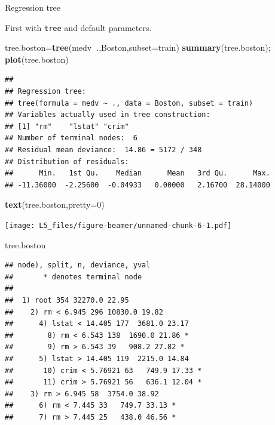 \documentclass[
  ignorenonframetext,
]{beamer}
\newenvironment{Shaded}{\begin{snugshade}}{\end{snugshade}}
\newcommand{\DataTypeTok}[1]{\textcolor[rgb]{0.13,0.29,0.53}{#1}}
\newcommand{\DecValTok}[1]{\textcolor[rgb]{0.00,0.00,0.81}{#1}}
\newcommand{\KeywordTok}[1]{\textcolor[rgb]{0.13,0.29,0.53}{\textbf{#1}}}
\newcommand{\NormalTok}[1]{#1}
\newcommand{\OperatorTok}[1]{\textcolor[rgb]{0.81,0.36,0.00}{\textbf{#1}}}
\begin{document}
\begin{frame}[fragile]

\begin{block}{Regression tree}

First with \texttt{tree} and default parameters.

\begin{Shaded}
\begin{Highlighting}[]
\NormalTok{tree.boston=}\KeywordTok{tree}\NormalTok{(medv}\OperatorTok{~}\NormalTok{.,Boston,}\DataTypeTok{subset=}\NormalTok{train)}
\KeywordTok{summary}\NormalTok{(tree.boston); }\KeywordTok{plot}\NormalTok{(tree.boston)}
\end{Highlighting}
\end{Shaded}

\begin{verbatim}
## 
## Regression tree:
## tree(formula = medv ~ ., data = Boston, subset = train)
## Variables actually used in tree construction:
## [1] "rm"    "lstat" "crim" 
## Number of terminal nodes:  6 
## Residual mean deviance:  14.86 = 5172 / 348 
## Distribution of residuals:
##      Min.   1st Qu.    Median      Mean   3rd Qu.      Max. 
## -11.36000  -2.25600  -0.04933   0.00000   2.16700  28.14000
\end{verbatim}

\begin{Shaded}
\begin{Highlighting}[]
\KeywordTok{text}\NormalTok{(tree.boston,}\DataTypeTok{pretty=}\DecValTok{0}\NormalTok{)}
\end{Highlighting}
\end{Shaded}

\texttt{[image: L5\_files/figure-beamer/unnamed-chunk-6-1.pdf]}

\begin{Shaded}
\begin{Highlighting}[]
\NormalTok{tree.boston}
\end{Highlighting}
\end{Shaded}

\begin{verbatim}
## node), split, n, deviance, yval
##       * denotes terminal node
## 
##  1) root 354 32270.0 22.95  
##    2) rm < 6.945 296 10830.0 19.82  
##      4) lstat < 14.405 177  3681.0 23.17  
##        8) rm < 6.543 138  1690.0 21.86 *
##        9) rm > 6.543 39   908.2 27.82 *
##      5) lstat > 14.405 119  2215.0 14.84  
##       10) crim < 5.76921 63   749.9 17.33 *
##       11) crim > 5.76921 56   636.1 12.04 *
##    3) rm > 6.945 58  3754.0 38.92  
##      6) rm < 7.445 33   749.7 33.13 *
##      7) rm > 7.445 25   438.0 46.56 *
\end{verbatim}

\end{block}

\end{frame}
\end{document}
